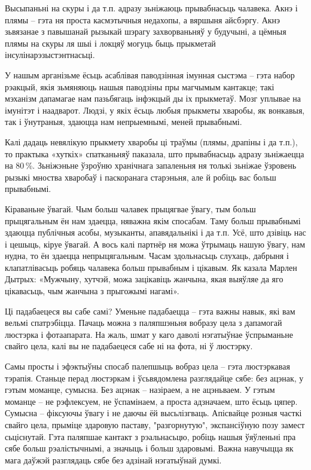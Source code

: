 Высыпаньні на скуры і да т.п. адразу зьніжаюць прывабнасьць чалавека. Акнэ і плямы – гэта ня проста касмэтычныя недахопы, а вяршыня айсбэргу. Акнэ зьвязанае з павышанай рызыкай шэрагу захворваньняў у будучыні, а цёмныя плямы на скуры ля шыі і локцяў могуць быць прыкметай інсулінарэзыстэнтнасьці.

У нашым арганізьме ёсьць асаблівая паводзінная імунная сыстэма – гэта набор рэакцый, якія зьмяняюць нашыя паводзіны пры магчымым кантакце; такі мэханізм дапамагае нам пазьбягаць інфэкцый ды іх прыкметаў. Мозг уплывае на імунітэт і наадварот. Людзі, у якіх ёсьць любыя прыкметы хваробы, як вонкавыя, так і ўнутраныя, здаюцца нам непрыемнымі, меней прывабнымі.

Калі дадаць невялікую прыкмету хваробы ці траўмы (плямы, драпіны і да т.п.), то практыка «хуткіх» спатканьняў паказала, што прывабнасьць адразу зьніжаецца на 80\,\%. Зьніжэньне ўзроўню хранічнага запаленьня ня толькі зьніжае ўзровень рызыкі мноства хваробаў і паскоранага старэньня, але й робіць вас больш прывабнымі.

Кіраваньне ўвагай. Чым больш чалавек прыцягвае ўвагу, тым больш прыцягальным ён нам здаецца, няважна якім спосабам. Таму больш прывабнымі здаюцца публічныя асобы, музыканты, апавядальнікі і да т.п. Усё, што дзівіць нас і цешыць, кіруе ўвагай. А вось калі партнёр ня можа ўтрымаць нашую ўвагу, нам нудна, то ён здаецца непрыцягальным. Часам здольнасьць слухаць, дабрыня і клапатлівасьць робяць чалавека больш прывабным і цікавым. Як казала Марлен Дытрых: «Мужчыну, хутчэй, можа зацікавіць жанчына, якая выяўляе да яго цікавасьць, чым жанчына з прыгожымі нагамі».

Ці падабаецеся вы сабе самі? Уменьне падабаецца – гэта важны навык, які вам вельмі спатрэбіцца. Пачаць можна з паляпшэньня вобразу цела з дапамогай люстэрка і фотаапарата. На жаль, шмат у каго даволі нэгатыўнае ўспрыманьне свайго цела, калі вы не падабаецеся сабе ні на фота, ні ў люстэрку.

Самы просты і эфэктыўны спосаб палепшыць вобраз цела – гэта люстэркавая тэрапія. Станьце перад люстэркам і ўсьвядомлена разглядайце сябе: без ацэнак, у гэтым моманце, сумысна. Без ацэнак – назіраем, а не ацэньваем. У гэтым моманце – не рэфлексуем, не ўспамінаем, а проста адзначаем, што ёсьць цяпер. Сумысна – фіксуючы ўвагу і не даючы ёй высьлізгваць. Апісвайце розныя часткі свайго цела, прыміце здаровую паставу, "разгорнутую", экспансіўную позу замест сьціснутай. Гэта паляпшае кантакт з рэальнасьцю, робіць нашыя ўяўленьні пра сябе больш рэалістычнымі, а значыць і больш здаровымі. Важна навучыцца як мага даўжэй разглядаць сябе без адзінай нэгатыўнай думкі.

